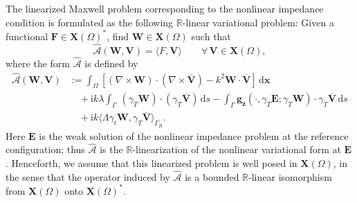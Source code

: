 \documentclass[10pt,a4paper]{amsart}
\numberwithin{equation}{section}
\begin{document}
The linearized Maxwell problem corresponding to the nonlinear impedance condition is formulated as the following $\mathbb{R}$-linear variational problem: Given a functional $\mathbf{F} \in \mathbf{X}(\Omega)^*$, find $\mathbf{W} \in \mathbf{X}(\Omega)$ such that
\begin{equation}
\widehat{\mathcal{A}}(\mathbf{W}, \mathbf{V}) = \langle F, \mathbf{V} \rangle \qquad \forall \, \mathbf{V} \in \mathbf{X}(\Omega),
\end{equation}
where the form $\widehat{\mathcal{A}}$ is defined by
\begin{equation}
\label{eq:linearized_weak_form}
\begin{aligned}
\widehat{\mathcal{A}}(\mathbf{W}, \mathbf{V}) &:= \int_{\Omega} \left[ (\nabla \times \mathbf{W}) \cdot (\nabla \times \overline{\mathbf{V}}) - k^2 \mathbf{W} \cdot \overline{\mathbf{V}} \right] \, \mathrm{d}\boldsymbol{x} \\
&\quad + \mathrm{i}k \lambda\int_{\Gamma}  \, (\gamma_T \mathbf{W}) \cdot (\gamma_T \overline{\mathbf{V}}) \, \mathrm{d}s - \int_{\Gamma} \mathbf{g}_{\boldsymbol{z}}(\cdot, \gamma_T \mathbf{E}; \gamma_T \mathbf{W}) \cdot \gamma_T \overline{\mathbf{V}} \, \mathrm{d}s \\
&\quad + \mathrm{i}k \langle \Lambda \gamma_t \mathbf{W}, \gamma_T\overline{\mathbf{V}} \rangle_{\Gamma_R}.
\end{aligned}
\end{equation}
 Here \(\mathbf E\) is the weak solution of the nonlinear impedance problem at
the reference configuration; thus \(\widehat{\mathcal A}\) is the
\(\mathbb R\)-linearization of the nonlinear variational form at
\(\mathbf E\). Henceforth, we assume that this linearized problem is well
posed in \(\mathbf X(\Omega)\), in the sense that the operator induced by
\(\widehat{\mathcal A}\) is a bounded \(\mathbb R\)-linear isomorphism from
\(\mathbf X(\Omega)\) onto \(\mathbf X(\Omega)^*\).
\end{document}
